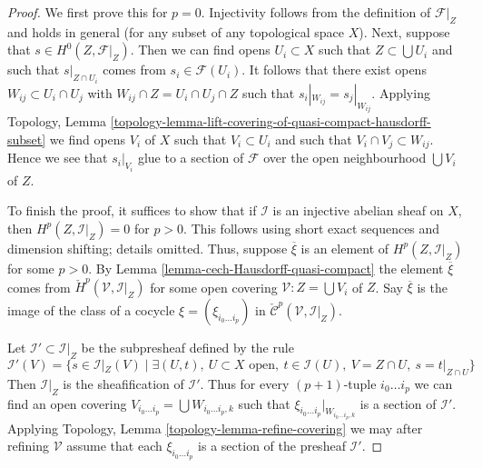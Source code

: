 \documentclass[10pt,a4paper]{amsart}
\theoremstyle{plain}
\theoremstyle{definition}
\theoremstyle{remark}
\numberwithin{equation}{subsection}
\begin{document}
\begin{proof}
We first prove this for $p = 0$. Injectivity follows from
the definition of $\mathcal{F}|_Z$ and holds in general
(for any subset of any topological space $X$). Next, suppose that
$s \in H^0(Z, \mathcal{F}|_Z)$. Then we can find opens $U_i \subset X$
such that $Z \subset \bigcup U_i$ and such that $s|_{Z \cap U_i}$
comes from $s_i \in \mathcal{F}(U_i)$. It follows that
there exist opens $W_{ij} \subset U_i \cap U_j$ with
$W_{ij} \cap Z = U_i \cap U_j \cap Z$ such that
$s_i|_{W_{ij}} = s_j|_{W_{ij}}$. Applying
Topology, Lemma
\ref{topology-lemma-lift-covering-of-quasi-compact-hausdorff-subset}
we find opens $V_i$ of $X$ such that $V_i \subset U_i$ and
such that $V_i \cap V_j \subset W_{ij}$. Hence we see that
$s_i|_{V_i}$ glue to a section of $\mathcal{F}$ over the
open neighbourhood $\bigcup V_i$ of $Z$.

\medskip\noindent
To finish the proof, it suffices to show that if $\mathcal{I}$ is an
injective abelian sheaf on $X$, then $H^p(Z, \mathcal{I}|_Z) = 0$
for $p > 0$. This follows using short exact sequences and dimension
shifting; details omitted. Thus, suppose $\overline{\xi}$ is an element
of $H^p(Z, \mathcal{I}|_Z)$ for some $p > 0$.
By Lemma \ref{lemma-cech-Hausdorff-quasi-compact}
the element $\overline{\xi}$ comes from
$\check{H}^p(\mathcal{V}, \mathcal{I}|_Z)$
for some open covering $\mathcal{V} : Z = \bigcup V_i$ of $Z$.
Say $\overline{\xi}$ is the image of the class of a cocycle
$\xi = (\xi_{i_0 \ldots i_p})$ in
$\check{\mathcal{C}}^p(\mathcal{V}, \mathcal{I}|_Z)$.

\medskip\noindent
Let $\mathcal{I}' \subset \mathcal{I}|_Z$ be the subpresheaf
defined by the rule
$$
\mathcal{I}'(V) =
\{s \in \mathcal{I}|_Z(V) \mid
\exists (U, t),\ U \subset X\text{ open},
\ t \in \mathcal{I}(U),\ V = Z \cap U,\ s = t|_{Z \cap U} \}
$$
Then $\mathcal{I}|_Z$ is the sheafification of $\mathcal{I}'$.
Thus for every $(p + 1)$-tuple $i_0 \ldots i_p$ we can find an
open covering $V_{i_0 \ldots i_p} = \bigcup W_{i_0 \ldots i_p, k}$
such that $\xi_{i_0 \ldots i_p}|_{W_{i_0 \ldots i_p, k}}$ is
a section of $\mathcal{I}'$. Applying
Topology, Lemma \ref{topology-lemma-refine-covering}
we may after refining $\mathcal{V}$ assume that each
$\xi_{i_0 \ldots i_p}$ is a section of the presheaf $\mathcal{I}'$.


\end{proof}
\end{document}
